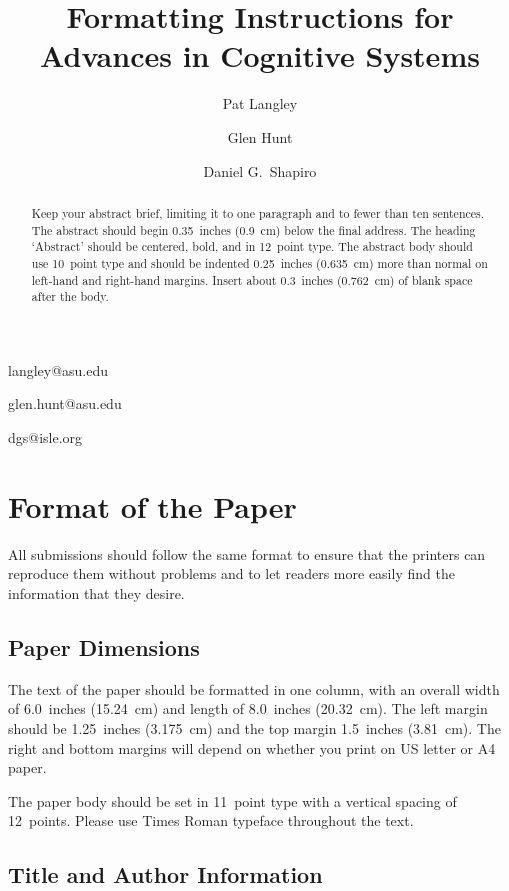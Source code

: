 \documentclass[11pt,letterpaper]{article}
\begin{document}
 

\title{Formatting Instructions for Advances in Cognitive Systems}
 
\author{Pat Langley}{langley@asu.edu}
\author{Glen Hunt}{glen.hunt@asu.edu}
\address{Computing Science and Engineering, Arizona State University, 
         Tempe, AZ 85287 USA}
\author{Daniel G.\ Shapiro}{dgs@isle.org}
\address{Institute for the Study of Learning and Expertise, 
         2164 Staunton Court, Palo Alto, CA 94306 USA}
\vskip 0.2in
 
\begin{abstract}Keep your abstract brief, limiting it to one paragraph 
and to fewer than ten sentences. The abstract should begin 0.35~inches 
(0.9~cm) below the final address. The heading `Abstract' should be
centered, bold, and in 12~point type. The abstract body should use
10~point type and should be indented 0.25~inches (0.635~cm) more than
normal on left-hand and right-hand margins. Insert about 0.3~inches 
(0.762~cm) of blank space after the body.
\end{abstract}

\section{Format of the Paper} 
 
All submissions should follow the same format to ensure that the 
printers can reproduce them without problems and to let readers 
more easily find the information that they desire.

\subsection{Paper Dimensions}

The text of the paper should be formatted in one column, with an
overall width of 6.0~inches (15.24~cm) and length of 8.0~inches 
(20.32~cm). The left margin should be 1.25~inches (3.175~cm) and the 
top margin 1.5~inches (3.81~cm). The right and bottom margins will
depend on whether you print on US letter or A4 paper.

The paper body should be set in 11~point type with a vertical spacing 
of 12~points. Please use Times Roman typeface throughout the text. 

\subsection{Title and Author Information}
\end{document}
